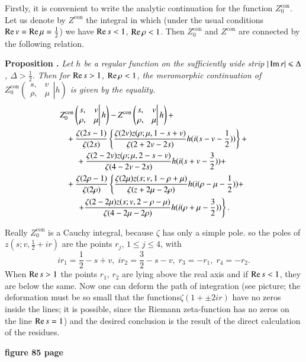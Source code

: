 Firstly, it is convenient to write the analytic continuation for the function $Z^{\text{con}}_0$. Let us denote by $Z^{\text{con}}$ the integral in which (under the usual conditions $\operatorname{Re} v = \operatorname{Re} \mu =\frac{1}{2}$) we have $\operatorname{Re} s < 1$, $\operatorname{Re} \rho <1$. Then $Z^{\text{con}}_0$ and $Z^{\text{con}}$ are connected by the following relation.

\medskip
\noindent
{\bfseries Proposition .\label{art7-prop6}}
\textit{Let $h$ be a regular function on the sufficiently wide strip $|\operatorname{Im} r | \leqslant \Delta$, $\Delta > \frac{1}{2}$. Then for $\operatorname{Re} s > 1$, $\operatorname{Re} \rho < 1$, the meromorphic continuation of $Z^{\text{con}}_0 
\left( 
\left. 
\begin{matrix}
s, & v\\
\rho, &\mu
\end{matrix}
\right| h
\right)$ is given by the equality.} 
\begin{align}
&Z^{\text{con}}_0 
\left( 
\left. 
\begin{matrix}
s, & v\\
\rho, &\mu
\end{matrix}
\right| h
\right) - Z^{\text{con}}
\left( 
\left. 
\begin{matrix}
s, & v\\
\rho, &\mu
\end{matrix}
\right| h
\right) + \label{art7-eq4.3}\\
& ~~~+ \frac{\zeta(2s-1)}{\zeta(2s)} \left\{\frac{\zeta(2v) z (\rho; \mu, 1 -s + v)}{\zeta(2+ 2 v - 2s)} h (i(s-v-\frac{1}{2})) \right\}  +
\notag \\
& \qquad + \frac{\zeta (2-2v) z (\rho ;\mu, 2 - s -v)}{\zeta(4-2v-2s)} h(i (s+ v - \frac{3}{2})) + \notag \\
& ~~~  +\frac{\zeta (2 \rho -1)}{\zeta (2\rho)}  \left\{ \frac{\zeta (2\mu) z (s; v , 1 - \rho + \mu)}{\zeta (z+ 2 \mu - 2 \rho)} h (i(\rho - \mu -\frac{1}{2})) + \right.\notag\\
& \qquad \left. + \frac{\zeta(2-2\mu) z (s; v, 2 - \rho -\mu)}{\zeta(4-2\mu - 2 \rho)} h (i (\rho + \mu - \frac{3}{2})) \right\}. \notag
\end{align}

Really $Z^{\text{con}}_0$ is a Cauchy integral, because $\zeta$ has only a simple pole. so the poles of $z(s; v, \frac{1}{2} + ir)$ are the points $r_j$, $1\leqslant j \leqslant 4$, with
$$
ir_1 = \frac{1}{2} - s+ v, \;  ir_2 =\frac{3}{2} - s - v, \; r_3 = - r_1, \; r_4 = -r_2.
$$
When $\operatorname{Re} s > 1$ the points $r_1$, $r_2$ are lying above the real axis and if $\operatorname{Re} s < 1$, they are below the same. Now one can deform the path of integration (see picture; the deformation must be so small that the functions\pageoriginale  $\zeta( 1+ \pm 2 ir)$ have no zeros inside the lines; it is possible, since the Riemann zeta-function has no zeros on the line $\operatorname{Re} s =1$) and the desired conclusion is the result of the direct calculation of the residues. 
\begin{center}
\textbf{\bf figure 85 page}
\end{center}

